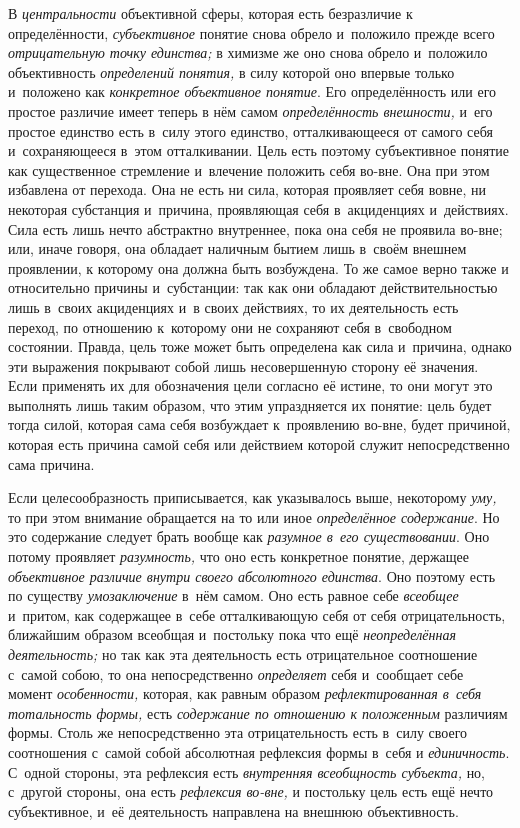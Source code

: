 В {\em центральности} объективной сферы, которая есть безразличие
к определённости, {\em субъективное}
понятие снова обрело и~положило прежде всего
{\em отрицательную точку единства;}
в химизме же оно снова обрело и~положило объективность
{\em определений понятия,}
в силу которой оно впервые только и~положено как
{\em конкретное объективное понятие}.
Его определённость или его простое различие имеет теперь в
нём самом {\em определённость
внешности,} и~его простое единство есть в~силу этого
единство, отталкивающееся от самого себя и~сохраняющееся в~этом
отталкивании. Цель есть поэтому субъективное понятие как существенное
стремление и~влечение положить себя во-вне. Она при этом избавлена от
перехода. Она не есть ни сила, которая проявляет себя вовне, ни некоторая
субстанция и~причина, проявляющая себя в~акциденциях и~действиях. Сила есть
лишь нечто абстрактно внутреннее, пока она себя не проявила во-вне; или,
иначе говоря, она обладает наличным бытием лишь в~своём внешнем проявлении,
к которому она должна быть возбуждена. То же самое верно также и
относительно причины и~субстанции: так как они обладают действительностью
лишь в~своих акциденциях и~в своих действиях, то их деятельность есть
переход, по отношению к~которому они не сохраняют себя в~свободном
состоянии. Правда, цель тоже может быть определена как сила и~причина,
однако эти выражения покрывают собой лишь несовершенную сторону её
значения. Если применять их для обозначения цели согласно её истине, то они
могут это выполнять лишь таким образом, что этим упраздняется их понятие:
цель будет тогда силой, которая сама себя возбуждает к~проявлению во-вне,
будет причиной, которая есть причина самой себя или действием которой
служит непосредственно сама причина.

Если целесообразность приписывается, как указывалось выше,
некоторому {\em уму,} то
при этом внимание обращается на то или иное
{\em определённое содержание}.
Но это содержание следует брать вообще как
{\em разумное в~его существовании}.
Оно потому проявляет
{\em разумность,} что оно
есть конкретное понятие, держащее
{\em объективное различие внутри своего
абсолютного единства}. Оно поэтому есть по существу
{\em умозаключение} в~нём
самом. Оно есть равное себе
{\em всеобщее} и~притом,
как содержащее в~себе отталкивающую себя от себя
отрицательность, ближайшим образом всеобщая и~постольку пока
что ещё {\em неопределённая
деятельность;} но так как эта деятельность есть
отрицательное соотношение с~самой собою, то она непосредственно
{\em определяет} себя и~сообщает себе момент {\em особенности,}
которая, как равным образом {\em рефлектированная в~себя тотальность
формы,} есть {\em содержание по отношению к
положенным} различиям формы. Столь же непосредственно эта
отрицательность есть в~силу своего соотношения с~самой собой абсолютная
рефлексия формы в~себя и {\em единичность}.
С~одной стороны, эта рефлексия есть {\em внутренняя всеобщность субъекта,}
но, с~другой стороны, она есть {\em рефлексия во-вне,} и
постольку цель есть ещё нечто субъективное, и~её деятельность направлена на
внешнюю объективность.

